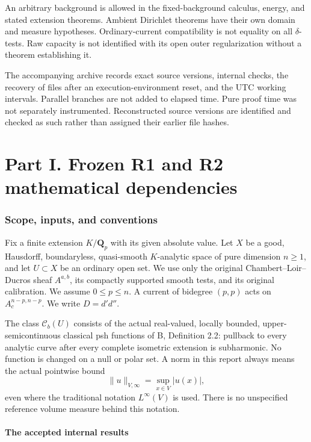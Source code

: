 \documentclass[11pt,a4paper]{article}
\numberwithin{equation}{section}
\theoremstyle{definition}
\theoremstyle{remark}
\newcommand{\Cb}{\mathcal C_b}
\begin{document}
An arbitrary background is allowed in the fixed-background calculus,
energy, and stated extension theorems. Ambient Dirichlet theorems have
their own domain and measure hypotheses. Ordinary-current compatibility
is not equality on all $\delta$-tests. Raw capacity is not identified
with its open outer regularization without a theorem establishing it.

The accompanying archive records exact source versions, internal checks,
the recovery of files after an execution-environment reset, and the UTC
working intervals. Parallel branches are not added to elapsed time.
Pure proof time was not separately instrumented. Reconstructed source
versions are identified and checked as such rather than assigned their
earlier file hashes.
\tableofcontents
\clearpage
\part*{Part I. Frozen R1 and R2 mathematical dependencies}

\section{Scope, inputs, and conventions}
\label{sec:inputs}

Fix a finite extension $K/\mathbf Q_p$ with its given absolute value.
Let $X$ be a good, Hausdorff, boundaryless, quasi-smooth $K$-analytic
space of pure dimension $n\geq1$, and let $U\subset X$ be an ordinary open
set. We use only the original Chambert--Loir--Ducros sheaf
$A^{a,b}$, its compactly supported smooth tests, and its original
calibration. We assume $0\leq p\leq n$. A current of bidegree $(p,p)$ acts on
$A_c^{n-p,n-p}$. We write $D=d'd''$.

The class $\Cb(U)$ consists of the actual real-valued, locally bounded,
upper-semicontinuous classical psh functions of \textup{B}, Definition
2.2: pullback to every analytic curve after every complete isometric
extension is subharmonic. No function is changed on a null or polar
set. A norm in this report always means the actual pointwise bound
\[
 \|u\|_{V,\infty}=\sup_{x\in V}|u(x)|,
\]
even where the traditional notation $L^\infty(V)$ is used. There is
no unspecified reference volume measure behind this notation.

\subsection{The accepted internal results}
\end{document}
